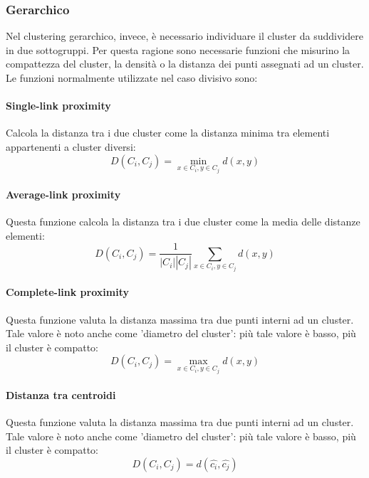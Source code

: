 \subsubsection{Gerarchico}
Nel clustering gerarchico, invece, è necessario individuare il cluster da suddividere in due sottogruppi. Per questa ragione sono necessarie funzioni che misurino la compattezza del cluster, la densità o la distanza dei punti assegnati ad un cluster. Le funzioni normalmente utilizzate nel caso divisivo sono:
\paragraph{Single-link proximity}
Calcola la distanza tra i due cluster come la distanza minima tra elementi appartenenti a cluster diversi:
\begin{equation}
  D\left ( C_i, C_j \right ) = \min_{x \in C_i, y \in C_j} d\left ( x, y \right )
\end{equation}

\paragraph{Average-link proximity}
Questa funzione calcola la distanza tra i due cluster come la media delle distanze elementi:
\begin{equation}
  D\left ( C_i, C_j \right ) = \frac{1}{|C_i||C_j|}\sum_{x \in C_i, y \in C_j} d\left ( x, y \right )
\end{equation}

\paragraph{Complete-link proximity}
Questa funzione valuta la distanza massima tra due punti interni ad un cluster. Tale valore è noto anche come 'diametro del cluster': più tale valore è basso, più il cluster è compatto:
\begin{equation}
  D\left ( C_i, C_j \right ) = \max_{x \in C_i, y \in C_j} d\left ( x, y \right )
\end{equation}

\paragraph{Distanza tra centroidi}
Questa funzione valuta la distanza massima tra due punti interni ad un cluster. Tale valore è noto anche come 'diametro del cluster': più tale valore è basso, più il cluster è compatto:
\begin{equation}
  D\left ( C_i, C_j \right ) = d\left ( \hat{c_i}, \hat{c_j} \right )
\end{equation}


